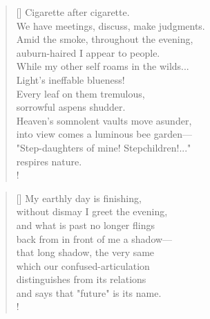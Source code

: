\documentclass[]{article}
\begin{document}
\vspace*{0.005\textheight}
\settowidth{\versewidth}{Amid the smoke, throughout the evening,}
\begin{verse}[\versewidth]
Cigarette after cigarette.\\
We have meetings, discuss, make judgments.\\
Amid the smoke, throughout the evening,\\
auburn-haired I appear to people.\\
While my other self roams in the wilds...\\
Light's ineffable blueness!\\
Every leaf on them tremulous,\\
sorrowful aspens shudder.\\
Heaven's somnolent vaults move asunder,\\
into view comes a luminous bee garden—\\
"Step-daughters of mine! Stepchildren!..."\\
respires nature.\\!
\end{verse}
\newpage 

\vspace*{0.05\textheight}
\settowidth{\versewidth}{and what is past no longer flings}
\begin{verse}[\versewidth]
My earthly day is finishing,\\
without dismay I greet the evening,\\
and what is past no longer flings\\
back from in front of me a shadow—\\
that long shadow, the very same\\
which our confused-articulation\\
distinguishes from its relations\\
and says that "future" is its name.\\!
\end{verse}
\bigskip \bigskip
\end{document}
